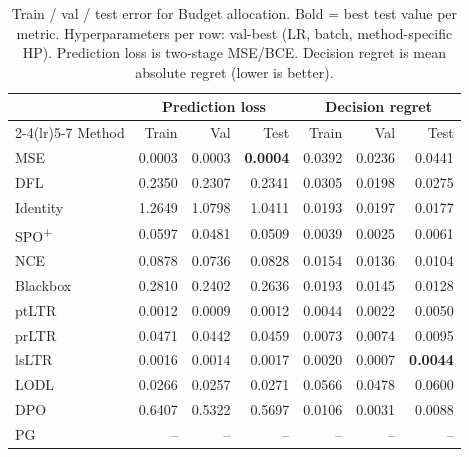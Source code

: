 \begin{table}[t]
\centering
\caption[Train/val/test error for Budget allocation.]{Train / val / test error for Budget allocation. Bold = best test value per metric. Hyperparameters per row: val-best (LR, batch, method-specific HP). Prediction loss is two-stage MSE/BCE. Decision regret is mean absolute regret (lower is better).}
\label{tab:err-budgetalloc}
\setlength{\tabcolsep}{4pt}
\renewcommand{\arraystretch}{1.05}
\begin{tabular}{@{}lrrrrrr@{}}
\toprule
& \multicolumn{3}{c}{Prediction loss} & \multicolumn{3}{c}{Decision regret} \\
\cmidrule(lr){2-4}\cmidrule(lr){5-7}
Method & Train & Val & Test & Train & Val & Test \\
\midrule
MSE & 0.0003 & 0.0003 & \textbf{0.0004} & 0.0392 & 0.0236 & 0.0441 \\
DFL & 0.2350 & 0.2307 & 0.2341 & 0.0305 & 0.0198 & 0.0275 \\
Identity & 1.2649 & 1.0798 & 1.0411 & 0.0193 & 0.0197 & 0.0177 \\
SPO\textsuperscript{+} & 0.0597 & 0.0481 & 0.0509 & 0.0039 & 0.0025 & 0.0061 \\
NCE & 0.0878 & 0.0736 & 0.0828 & 0.0154 & 0.0136 & 0.0104 \\
Blackbox & 0.2810 & 0.2402 & 0.2636 & 0.0193 & 0.0145 & 0.0128 \\
ptLTR & 0.0012 & 0.0009 & 0.0012 & 0.0044 & 0.0022 & 0.0050 \\
prLTR & 0.0471 & 0.0442 & 0.0459 & 0.0073 & 0.0074 & 0.0095 \\
lsLTR & 0.0016 & 0.0014 & 0.0017 & 0.0020 & 0.0007 & \textbf{0.0044} \\
LODL & 0.0266 & 0.0257 & 0.0271 & 0.0566 & 0.0478 & 0.0600 \\
DPO & 0.6407 & 0.5322 & 0.5697 & 0.0106 & 0.0031 & 0.0088 \\
PG & -- & -- & -- & -- & -- & -- \\
\bottomrule
\end{tabular}
\end{table}

